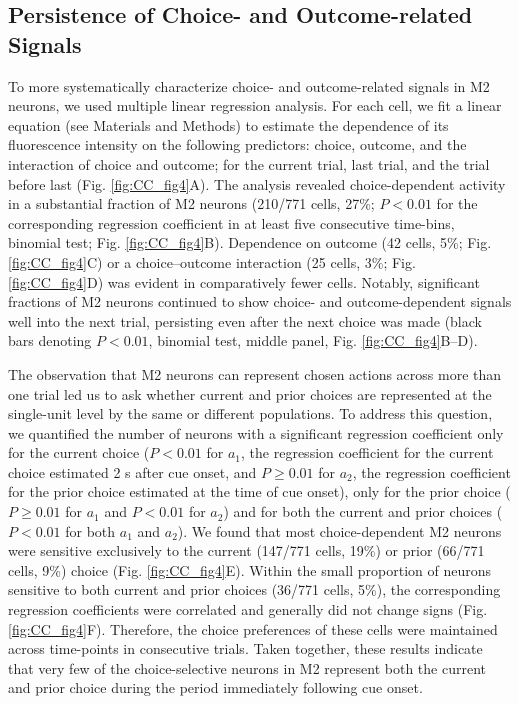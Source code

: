 \subsection{Persistence of Choice- and Outcome-related Signals}
To more systematically characterize choice- and outcome-related signals in M2 neurons, we used multiple linear regression analysis. For each cell, we fit a linear equation (see Materials and Methods) to estimate the dependence of its fluorescence intensity on the following predictors: choice, outcome, and the interaction of choice and outcome; for the current trial, last trial, and the trial before last (Fig. \ref{fig:CC_fig4}A). The analysis revealed choice-dependent activity in a substantial fraction of M2 neurons (210/771 cells, 27\%; $P < 0.01$ for the corresponding regression coefficient in at least five consecutive time-bins, binomial test; Fig. \ref{fig:CC_fig4}B). Dependence on outcome (42 cells, 5\%; Fig. \ref{fig:CC_fig4}C) or a choice–outcome interaction (25 cells, 3\%; Fig. \ref{fig:CC_fig4}D) was evident in comparatively fewer cells. Notably, significant fractions of M2 neurons continued to show choice- and outcome-dependent signals well into the next trial, persisting even after the next choice was made (black bars denoting $P < 0.01$, binomial test, middle panel, Fig. \ref{fig:CC_fig4}B–D).



The observation that M2 neurons can represent chosen actions across more than one trial led us to ask whether current and prior choices are represented at the single-unit level by the same or different populations. To address this question, we quantified the number of neurons with a significant regression coefficient only for the current choice ($P < 0.01$ for $a_1$, the regression coefficient for the current choice estimated 2 s after cue onset, and $P \geq 0.01$ for $a_2$, the regression coefficient for the prior choice estimated at the time of cue onset), only for the prior choice ($P \geq 0.01$ for $a_1$ and $P < 0.01$ for $a_2$) and for both the current and prior choices ($P < 0.01$ for both $a_1$ and $a_2$). We found that most choice-dependent M2 neurons were sensitive exclusively to the current (147/771 cells, 19\%) or prior (66/771 cells, 9\%) choice (Fig. \ref{fig:CC_fig4}E). Within the small proportion of neurons sensitive to both current and prior choices (36/771 cells, 5\%), the corresponding regression coefficients were correlated and generally did not change signs (Fig. \ref{fig:CC_fig4}F). Therefore, the choice preferences of these cells were maintained across time-points in consecutive trials. Taken together, these results indicate that very few of the choice-selective neurons in M2 represent both the current and prior choice during the period immediately following cue onset.

